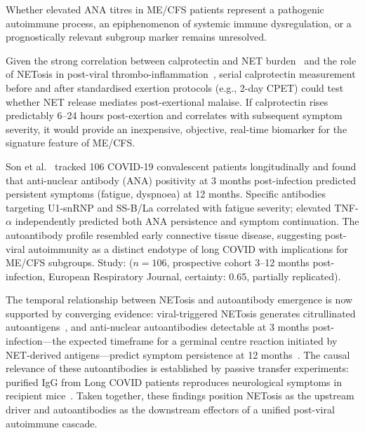 \begin{open_question}
\label{q:ana-clinical-significance}
Whether elevated ANA titres in ME/CFS patients represent a pathogenic autoimmune process, an epiphenomenon of systemic immune dysregulation, or a prognostically relevant subgroup marker remains unresolved.
\end{open_question}

\begin{open_question}
\label{q:calprotectin-pem}
Given the strong correlation between calprotectin and NET burden~\cite{Hetland2022}
and the role of NETosis in post-viral thrombo-inflammation~\cite{Krinsky2023},
serial calprotectin measurement before and after standardised exertion protocols
(e.g., 2-day CPET) could test whether NET release mediates post-exertional malaise.
If calprotectin rises predictably 6--24 hours post-exertion and correlates with
subsequent symptom severity, it would provide an inexpensive, objective, real-time
biomarker for the signature feature of ME/CFS.
\end{open_question}

\begin{observation}
\label{obs:son2023-ana-long-covid}
Son et al.~\cite{Son2023} tracked 106 COVID-19 convalescent patients longitudinally and found that anti-nuclear antibody (ANA) positivity at 3 months post-infection predicted persistent symptoms (fatigue, dyspnoea) at 12 months. Specific antibodies targeting U1-snRNP and SS-B/La correlated with fatigue severity; elevated TNF-$\alpha$ independently predicted both ANA persistence and symptom continuation. The autoantibody profile resembled early connective tissue disease, suggesting post-viral autoimmunity as a distinct endotype of long COVID with implications for ME/CFS subgroups.
Study: ($n=106$, prospective cohort 3--12 months post-infection, European Respiratory Journal, certainty: 0.65, partially replicated).
\end{observation}

The temporal relationship between NETosis and autoantibody emergence is now
supported by converging evidence: viral-triggered NETosis generates citrullinated
autoantigens~\cite{Monsalve2025}, and anti-nuclear autoantibodies detectable at
3 months post-infection---the expected timeframe for a germinal centre reaction
initiated by NET-derived antigens---predict symptom persistence at 12
months~\cite{Son2023}. The causal relevance of these autoantibodies is
established by passive transfer experiments: purified IgG from Long COVID
patients reproduces neurological symptoms in recipient
mice~\cite{GuedesDeSa2024}. Taken together, these findings position NETosis as
the upstream driver and autoantibodies as the downstream effectors of a unified
post-viral autoimmune cascade.

